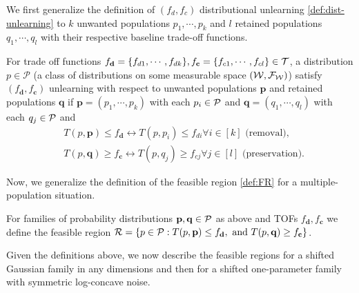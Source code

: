 We first generalize the definition of $(f_d,f_c)$ distributional unlearning  \ref{def:dist-unlearning} to $k$ unwanted populations $p_1, \cdots, p_k$ and $l$ retained populations $q_1, \cdots, q_l$ with their respective baseline trade-off functions.
\begin{definition}
\label{def:dist-unlearning_multi}
For trade off functions $f_{\mathbf{d}} = \{f_{d1}, \cdots, f_{dk}\},f_{\mathbf{c}} = \{f_{c1}, \cdots,f_{cl}\} \in \mathcal{T}$, a distribution $p \in \mathcal{P}$ (a class of distributions on some measurable space $(\mathcal{W}, \mathcal{F}_{\mathcal{W}})$) satisfy $(f_{\mathbf{d}},f_{\mathbf{c}})$ unlearning with respect to unwanted populations $\mathbf{p}$ and retained populations $ \mathbf{q} $ if $\mathbf{p}= (p_1, \cdots, p_k)$ with each $p_i \in\mathcal{P}$ and $\mathbf{q}= (q_1, \cdots, q_l)$ with each $q_j \in \mathcal{P}$ and
\begin{align}
&
T(p, \mathbf{p}) \leq f_{\mathbf{d}}  \leftrightarrow T(p, p_i) \leq f_{di} \forall i \in [k]  \text{ (removal)},
\\
&
T(p, \mathbf{q}) \geq f_{\mathbf{c}} \leftrightarrow T(p, q_j) \geq f_{cj}  \forall j \in [l] \text{ (preservation)}.
\end{align}
\end{definition}
Now, we generalize the definition of the feasible region \ref{def:FR} for a multiple-population situation.
\begin{definition}
   For families of probability distributions $\mathbf{p},\mathbf{q} \in \mathcal{P}$ as above  and TOFs $f_{\mathbf{d}},f_{\mathbf{c}}$ we define the feasible region  $\mathcal{R}=\{p \in \mathcal{P}: T(p, \mathbf{p}) \leq f_{\mathbf{d}}, \text{ and } T(p, \mathbf{q}) \geq f_{\mathbf{c}}\}$.
\end{definition}
Given the definitions above, we now describe the feasible regions for a shifted Gaussian family in any dimensions and then for a shifted one-parameter family with symmetric log-concave noise.

